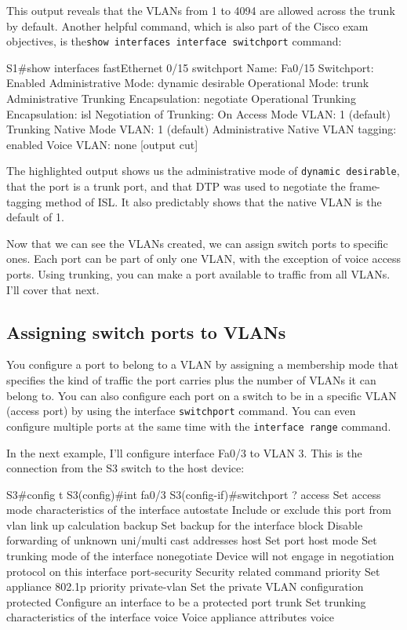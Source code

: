 \documentclass[b5paper,11pt]{memoir}
\begin{document}
This output reveals that the VLANs from 1 to 4094 are allowed across the trunk by default.
Another helpful command, which is also part of the Cisco exam objectives, is the\texttt{show\ interfaces\ interface\ switchport} command:

\begin{cli}
S1#show interfaces fastEthernet 0/15 switchport
Name: Fa0/15
Switchport: Enabled
Administrative Mode: dynamic desirable
Operational Mode: trunk
Administrative Trunking Encapsulation: negotiate
Operational Trunking Encapsulation: isl
Negotiation of Trunking: On
Access Mode VLAN: 1 (default)
Trunking Native Mode VLAN: 1 (default)
Administrative Native VLAN tagging: enabled
Voice VLAN: none
[output cut]
\end{cli}

The highlighted output shows us the administrative mode of
\texttt{dynamic\ desirable}, that the port is a trunk port, and that DTP was used to negotiate the frame-tagging method of ISL.
It also predictably shows that the native VLAN is the default of 1.

Now that we can see the VLANs created, we can assign switch ports to specific ones.
Each port can be part of only one VLAN, with the exception of voice access ports.
Using trunking, you can make a port available to traffic from all VLANs.
I'll cover that next.

\subsection{Assigning switch ports to VLANs}

You configure a port to belong to a VLAN by assigning a membership mode
that specifies the kind of traffic the port carries plus the number of
VLANs it can belong to. You can also configure each port on a switch to
be in a specific VLAN (access port) by using the interface
\texttt{switchport} command. You can even configure multiple ports at
the same time with the \texttt{interface\ range} command.

In the next example, I'll configure interface Fa0/3 to VLAN 3. This is
the connection from the S3 switch to the host device:

\begin{cli}
S3#config t
S3(config)#int fa0/3
S3(config-if)#switchport ?
  access         Set access mode characteristics of the interface
  autostate      Include or exclude this port from vlan link up calculation
  backup         Set backup for the interface
  block          Disable forwarding of unknown uni/multi cast addresses
  host           Set port host
  mode           Set trunking mode of the interface
  nonegotiate    Device will not engage in negotiation protocol on this
                 interface
  port-security  Security related command
  priority       Set appliance 802.1p priority
  private-vlan   Set the private VLAN configuration
  protected      Configure an interface to be a protected port
  trunk          Set trunking characteristics of the interface
  voice          Voice appliance attributes voice
\end{cli}
\end{document}
